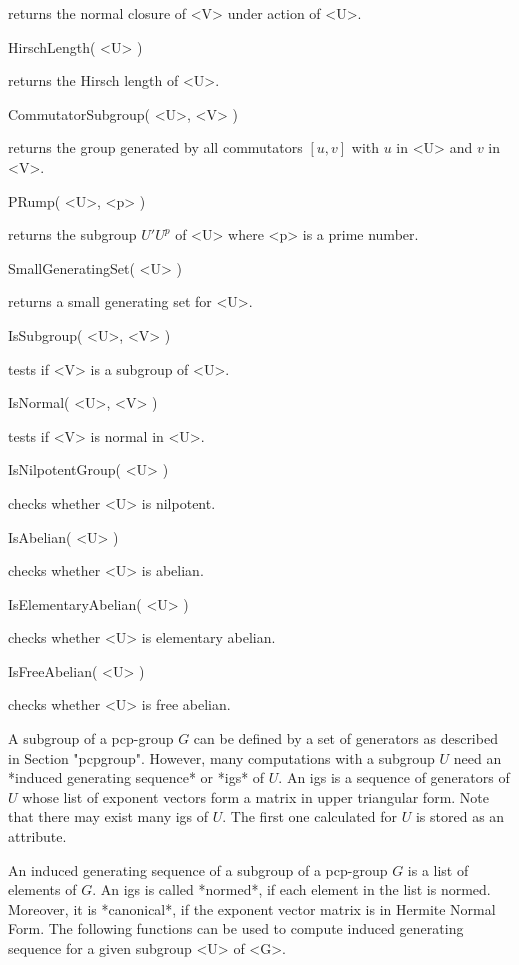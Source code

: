 returns  the normal closure of <V>  under action of <U>. 

\>HirschLength( <U> )

returns the Hirsch length of <U>.

\>CommutatorSubgroup( <U>, <V> )

returns the group generated by all commutators $[u,v]$ with $u$ in <U>
and $v$ in <V>.

\>PRump( <U>, <p> )

returns the subgroup $U'U^p$ of <U> where <p> is a prime number.

\> SmallGeneratingSet( <U> )

returns a small generating set for <U>.


\>IsSubgroup( <U>, <V> )

tests if <V> is a subgroup of <U>.

\>IsNormal( <U>, <V> )

tests if <V> is normal in <U>.

\>IsNilpotentGroup( <U> )

checks whether <U> is nilpotent.

\>IsAbelian( <U> )

checks whether <U> is abelian.

\>IsElementaryAbelian( <U> )

checks whether <U> is elementary abelian.

\>IsFreeAbelian( <U> )

checks whether <U> is free abelian.


A subgroup of a pcp-group $G$ can be defined by a set of generators as 
described in Section "pcpgroup". However, many computations  with a 
subgroup $U$ need  an *induced generating sequence* or *igs*  of $U$.  
An igs is a sequence of generators of $U$ whose list of exponent vectors  
form a matrix  in upper triangular form.  Note that there may  exist 
many igs of $U$.  The first one  calculated for $U$ is stored as an 
attribute.

An induced generating sequence of a subgroup of a pcp-group $G$ is a
list of elements of $G$.  An igs is called *normed*, if each element
in the list is normed.  Moreover, it is *canonical*, if the exponent
vector matrix is in Hermite Normal Form. The following functions can
be used to compute induced generating sequence for a given subgroup
<U> of <G>.


